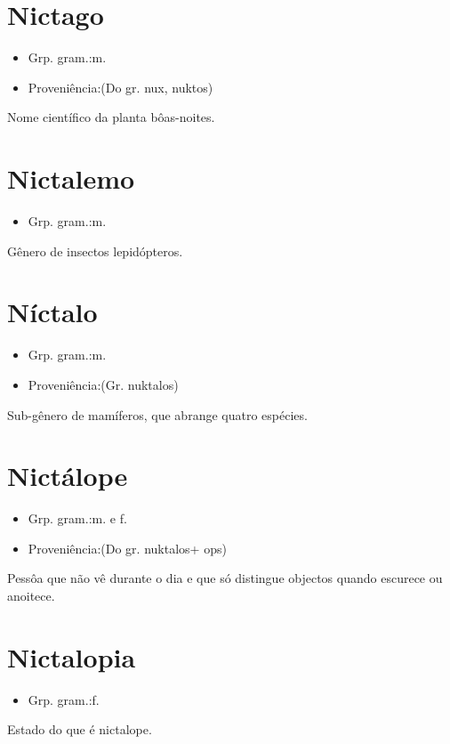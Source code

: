 \section{Nictago}
\begin{itemize}
\item {Grp. gram.:m.}
\end{itemize}
\begin{itemize}
\item {Proveniência:(Do gr. \textunderscore nux\textunderscore , \textunderscore nuktos\textunderscore )}
\end{itemize}
Nome científico da planta bôas-noites.
\section{Nictalemo}
\begin{itemize}
\item {Grp. gram.:m.}
\end{itemize}
Gênero de insectos lepidópteros.
\section{Níctalo}
\begin{itemize}
\item {Grp. gram.:m.}
\end{itemize}
\begin{itemize}
\item {Proveniência:(Gr. \textunderscore nuktalos\textunderscore )}
\end{itemize}
Sub-gênero de mamíferos, que abrange quatro espécies.
\section{Nictálope}
\begin{itemize}
\item {Grp. gram.:m.  e  f.}
\end{itemize}
\begin{itemize}
\item {Proveniência:(Do gr. \textunderscore nuktalos\textunderscore  + \textunderscore ops\textunderscore )}
\end{itemize}
Pessôa que não vê durante o dia e que só distingue objectos quando escurece ou anoitece.
\section{Nictalopia}
\begin{itemize}
\item {Grp. gram.:f.}
\end{itemize}
Estado do que é nictalope.
